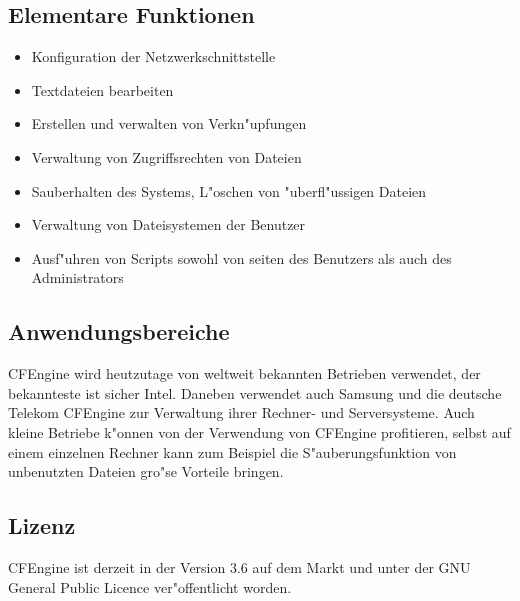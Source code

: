 \subsection{Elementare Funktionen}
\begin{itemize}
	\item Konfiguration der Netzwerkschnittstelle
	\item Textdateien bearbeiten
	\item Erstellen und verwalten von Verkn"upfungen
	\item Verwaltung von Zugriffsrechten von Dateien
	\item Sauberhalten des Systems, L"oschen von "uberfl"ussigen Dateien
	\item Verwaltung von Dateisystemen der Benutzer
	\item Ausf"uhren von Scripts sowohl von seiten des Benutzers als auch des Administrators
\end{itemize}
\subsection{Anwendungsbereiche}
CFEngine wird heutzutage von weltweit bekannten Betrieben verwendet, der bekannteste ist sicher Intel. Daneben verwendet auch Samsung und die deutsche Telekom CFEngine zur Verwaltung ihrer Rechner- und Serversysteme. Auch kleine Betriebe k"onnen von der Verwendung von CFEngine profitieren, selbst auf einem einzelnen Rechner kann zum Beispiel die S"auberungsfunktion von unbenutzten Dateien gro"se Vorteile bringen.
\subsection{Lizenz}
CFEngine ist derzeit in der Version 3.6 auf dem Markt und unter der GNU General Public Licence ver"offentlicht worden.
%
